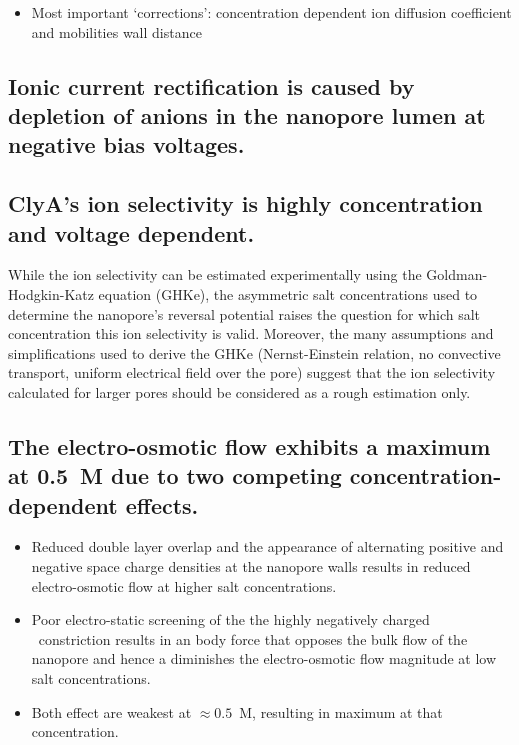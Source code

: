 \documentclass[journal=ancac3, manuscript=article, etalmode=truncate,maxauthors=0]{achemso}
\begin{document}
\begin{itemize}
  \item Most important `corrections':
  \subitem concentration dependent ion diffusion coefficient and mobilities
  \subitem wall distance 
\end{itemize}

\subsection{Ionic current rectification is caused by depletion of anions in the nanopore lumen at negative 
bias voltages.}

\subsection{ClyA's ion selectivity is highly concentration and voltage dependent.}
While the ion selectivity can be estimated experimentally using the Goldman-Hodgkin-Katz 
equation (GHKe),\cite{franceschini2016,huang2017} the asymmetric salt concentrations used to determine the 
nanopore's reversal potential raises the question for which salt concentration this ion selectivity is valid.
Moreover, the many assumptions and simplifications used to derive the GHKe (Nernst-Einstein relation, no 
convective transport, uniform electrical field over the pore) suggest that the ion selectivity calculated for 
larger pores should be considered as a rough estimation only.

\subsection{The electro-osmotic flow exhibits a maximum at 0.5~M due to two competing concentration-dependent 
effects.}

\begin{itemize}
  \item Reduced double layer overlap and the appearance of alternating positive and negative space charge 
  densities at the nanopore walls results in reduced electro-osmotic flow at higher salt concentrations.
  \item Poor electro-static screening of the the highly negatively charged \trans\ constriction 
  results in an body force that opposes the bulk flow of the nanopore and hence a diminishes the 
  electro-osmotic flow magnitude at low salt concentrations.
  \item Both effect are weakest at $\approx0.5$~M, resulting in maximum at that concentration.
\end{itemize}
\end{document}
